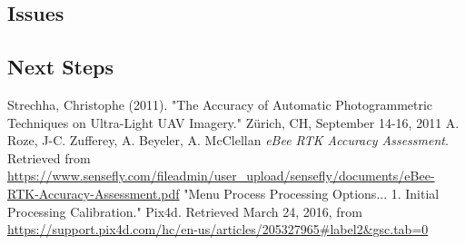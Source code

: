 \documentclass{article}
\begin{document}
\subsection{Issues}
\subsection{Next Steps}
\begin{thebibliography}{9}
Strechha,  Christophe (2011). "The Accuracy of Automatic Photogrammetric Techniques on Ultra-Light UAV Imagery."  Zürich, CH, September 14-16, 2011
A. Roze, J-C. Zufferey, A. Beyeler, A. McClellan \textit{eBee RTK Accuracy Assessment}.
Retrieved from \url{https://www.sensefly.com/fileadmin/user_upload/sensefly/documents/eBee-RTK-Accuracy-Assessment.pdf}
"Menu Process Processing Options... 1. Initial Processing Calibration." Pix4d. Retrieved March 24, 2016, from \url{https://support.pix4d.com/hc/en-us/articles/205327965#label2&gsc.tab=0}
\end{thebibliography}
\thispagestyle{lastpage}
\end{document}
